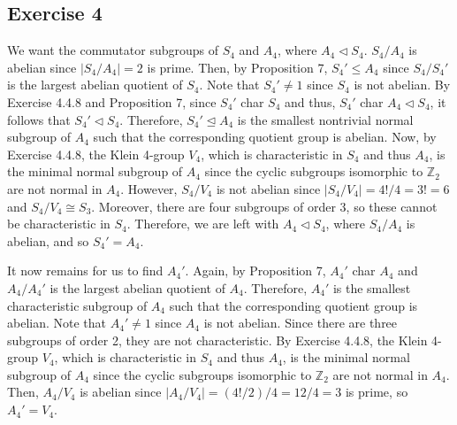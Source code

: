 \subsection*{Exercise 4}
We want the commutator subgroups of $S_4$ and $A_4$, where $A_4 \triangleleft S_4$. $S_4/A_4$ is abelian since $|S_4/A_4| = 2$ is prime. Then, by Proposition 7, $S_4' \le A_4$ since $S_4/S_4'$ is the largest abelian quotient of $S_4$. Note that $S_4' \not=1$ since $S_4$ is not abelian. By Exercise 4.4.8 and Proposition 7, since $S_4'$ char $S_4$ and thus, $S_4'$ char $A_4 \triangleleft S_4$, it follows that $S_4' \triangleleft S_4$. Therefore, $S_4' \trianglelefteq A_4$ is the smallest nontrivial normal subgroup of $A_4$ such that the corresponding quotient group is abelian. Now, by Exercise 4.4.8, the Klein 4-group $V_4$, which is characteristic in $S_4$ and thus $A_4$, is the minimal normal subgroup of $A_4$ since the cyclic subgroups isomorphic to $\mathbb{Z}_2$ are not normal in $A_4$. However, $S_4/V_4$ is not abelian since $|S_4/V_4| = 4!/4 = 3! = 6$ and $S_4/V_4 \cong S_3$. Moreover, there are four subgroups of order 3, so these cannot be characteristic in $S_4$. Therefore, we are left with $A_4 \triangleleft S_4$, where $S_4/A_4$ is abelian, and so $S_4' = A_4$.

It now remains for us to find $A_4'$. Again, by Proposition 7, $A_4'$ char $A_4$ and $A_4/A_4'$ is the largest abelian quotient of $A_4$. Therefore, $A_4'$ is the smallest characteristic subgroup of $A_4$ such that the corresponding quotient group is abelian. Note that $A_4' \not= 1$ since $A_4$ is not abelian. Since there are three subgroups of order 2, they are not characteristic. By Exercise 4.4.8, the Klein 4-group $V_4$, which is characteristic in $S_4$ and thus $A_4$, is the minimal normal subgroup of $A_4$ since the cyclic subgroups isomorphic to $\mathbb{Z}_2$ are not normal in $A_4$. Then, $A_4/V_4$ is abelian since $|A_4/V_4| = (4!/2)/4 = 12/4 = 3$ is prime, so $A_4' = V_4$.